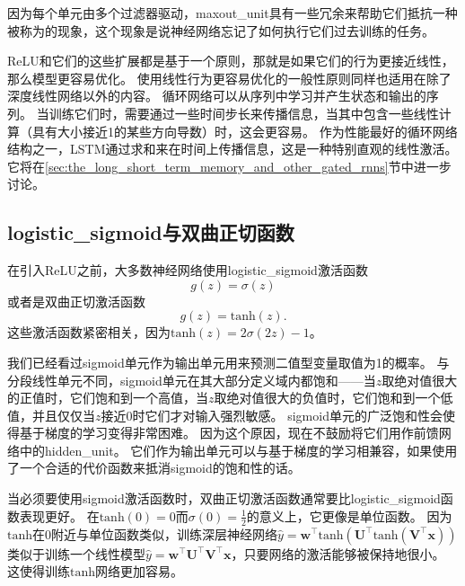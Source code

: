 因为每个单元由多个过滤器驱动，\gls{maxout_unit}具有一些冗余来帮助它们抵抗一种被称为的现象，这个现象是说神经网络忘记了如何执行它们过去训练的任务\citep{Goodfellow+al-ICLR2014-small}。

\gls{ReLU}和它们的这些扩展都是基于一个原则，那就是如果它们的行为更接近线性，那么模型更容易优化。
使用线性行为更容易优化的一般性原则同样也适用在除了深度线性网络以外的内容。
循环网络可以从序列中学习并产生状态和输出的序列。
当训练它们时，需要通过一些时间步长来传播信息，当其中包含一些线性计算（具有大小接近1的某些方向导数）时，这会更容易。
作为性能最好的循环网络结构之一，LSTM通过求和来在时间上传播信息，这是一种特别直观的线性激活。
它将在\ref{sec:the_long_short_term_memory_and_other_gated_rnns}节中进一步讨论。


\subsection{\gls{logistic_sigmoid}与双曲正切函数}
\label{sec:logistic_sigmoid_and_hyperbolic_tangent}

在引入\gls{ReLU}之前，大多数神经网络使用\gls{logistic_sigmoid}激活函数
\begin{equation}
g(z) = \sigma(z)
\end{equation}
或者是双曲正切激活函数
\begin{equation}
g(z) = \text{tanh}(z).
\end{equation}
这些激活函数紧密相关，因为$\text{tanh}(z)=2\sigma(2z)-1$。

我们已经看过\gls{sigmoid}单元作为输出单元用来预测二值型变量取值为1的概率。
与分段线性单元不同，\gls{sigmoid}单元在其大部分定义域内都饱和——当$z$取绝对值很大的正值时，它们饱和到一个高值，当$z$取绝对值很大的负值时，它们饱和到一个低值，并且仅仅当$z$接近0时它们才对输入强烈敏感。
\gls{sigmoid}单元的广泛饱和性会使得基于梯度的学习变得非常困难。
因为这个原因，现在不鼓励将它们用作前馈网络中的\gls{hidden_unit}。
它们作为输出单元可以与基于梯度的学习相兼容，如果使用了一个合适的代价函数来抵消\gls{sigmoid}的饱和性的话。

当必须要使用\gls{sigmoid}激活函数时，双曲正切激活函数通常要比\gls{logistic_sigmoid}函数表现更好。
在$\text{tanh}(0)=0$而$\sigma(0)=\frac{1}{2}$的意义上，它更像是单位函数。
因为$\text{tanh}$在0附近与单位函数类似，训练深层神经网络$\hat{y}=\bm{w}^\top \text{tanh}(\bm{U}^\top \text{tanh}(\bm{V}^\top \bm{x}))$类似于训练一个线性模型$\hat{y}= \bm{w}^\top \bm{U}^\top \bm{V}^\top \bm{x}$，只要网络的激活能够被保持地很小。
这使得训练$\text{tanh}$网络更加容易。

